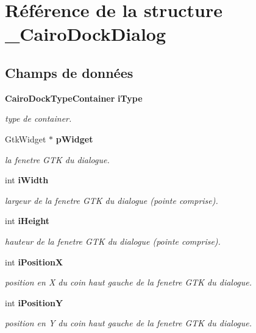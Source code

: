 \section{Référence de la structure \_\-CairoDockDialog}
\label{struct__CairoDockDialog}
\subsection*{Champs de données}
\begin{CompactItemize}
\item 
{\bf CairoDockTypeContainer} {\bf iType}
\begin{CompactList}\small\item\em type de container. \item\end{CompactList}\item 
GtkWidget $\ast$ {\bf pWidget}
\begin{CompactList}\small\item\em la fenetre GTK du dialogue. \item\end{CompactList}\item 
int {\bf iWidth}
\begin{CompactList}\small\item\em largeur de la fenetre GTK du dialogue (pointe comprise). \item\end{CompactList}\item 
int {\bf iHeight}
\begin{CompactList}\small\item\em hauteur de la fenetre GTK du dialogue (pointe comprise). \item\end{CompactList}\item 
int {\bf iPositionX}
\begin{CompactList}\small\item\em position en X du coin haut gauche de la fenetre GTK du dialogue. \item\end{CompactList}\item 
int {\bf iPositionY}
\begin{CompactList}\small\item\em position en Y du coin haut gauche de la fenetre GTK du dialogue. \item\end{CompactList}\item 

\end{CompactItemize}
